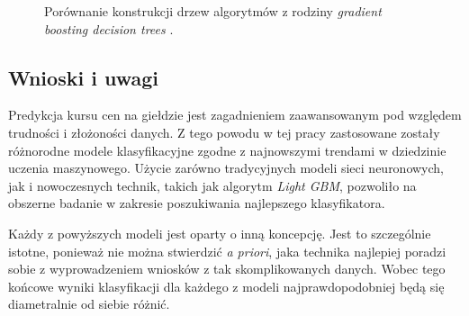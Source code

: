 \documentclass[a4paper, twoside, 11pt, openright]{article}
\begin{document}
\begin{figure}[H]%
\centering
{}%
\qquad
{}%
\caption{Porównanie konstrukcji drzew algorytmów z rodziny \textit{gradient boosting decision trees} \cite{dectreescompare}.}
\label{img:level-leaf-wise}
\end{figure}


\subsection{Wnioski i uwagi}

Predykcja kursu cen na giełdzie jest zagadnieniem zaawansowanym pod względem trudności i złożoności danych. Z tego powodu w tej pracy zastosowane zostały różnorodne modele klasyfikacyjne zgodne z najnowszymi trendami w dziedzinie uczenia maszynowego. Użycie zarówno tradycyjnych modeli sieci neuronowych, jak i nowoczesnych technik, takich jak algorytm \textit{Light GBM}, pozwoliło na obszerne badanie w zakresie poszukiwania najlepszego klasyfikatora. 

\bigskip

Każdy z powyższych modeli jest oparty o inną koncepcję. Jest to szczególnie istotne, ponieważ nie można stwierdzić \textit{a priori}, jaka technika najlepiej poradzi sobie z wyprowadzeniem wniosków z tak skomplikowanych danych. Wobec tego końcowe wyniki klasyfikacji dla każdego z modeli najprawdopodobniej będą się diametralnie od siebie różnić. 
\end{document}

